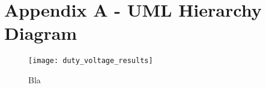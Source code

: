 \documentclass[10pt,a4paper]{report}
\author{Daniel G. Holmes}
\begin{document}
\section*{Appendix A - UML Hierarchy Diagram}

\begin{figure}[h]
	\centering
		\texttt{[image: duty\_voltage\_results]}
	\label{top}
	\caption{Bla}
\end{figure}
\end{document}
